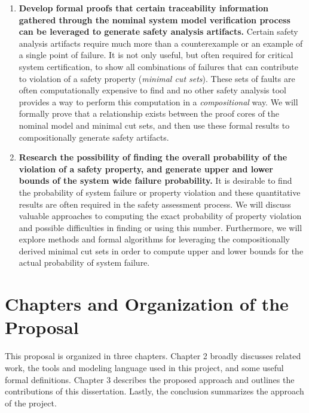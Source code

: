 \begin{enumerate}
\item \textbf{Develop formal proofs that certain traceability information gathered through the nominal system model verification process can be leveraged to generate safety analysis artifacts.} Certain safety analysis artifacts require much more than a counterexample or an example of a single point of failure. It is not only useful, but often required for critical system certification, to show all combinations of failures that can contribute to violation of a safety property (\textit{minimal cut sets}). These sets of faults are often computationally expensive to find and no other safety analysis tool provides a way to perform this computation in a \textit{compositional} way. We will formally prove that a relationship exists between the proof cores of the nominal model and minimal cut sets, and then use these formal results to compositionally generate safety artifacts. 

\item \textbf{Research the possibility of finding the overall probability of the violation of a safety property, and generate upper and lower bounds of the system wide failure probability.} It is desirable to find the probability of system failure or property violation and these quantitative results are often required in the safety assessment process. We will discuss valuable approaches to computing the exact probability of property violation and possible difficulties in finding or using this number. Furthermore, we will explore methods and formal algorithms for leveraging the compositionally derived minimal cut sets in order to compute upper and lower bounds for the actual probability of system failure. 
\end{enumerate}





\section{Chapters and Organization of the Proposal}
This proposal is organized in three chapters. Chapter 2 broadly discusses related work, the tools and modeling language used in this project, and some useful formal definitions. Chapter 3 describes the proposed approach and outlines the contributions of this dissertation. Lastly, the conclusion summarizes the approach of the project.


